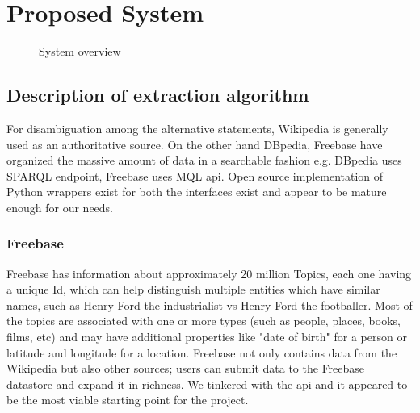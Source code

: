 \documentclass[11pt]{article}
\begin{document}
\section {Proposed System}


\begin{figure}
  \centering
  \caption{System overview}
  \label{fig:system}
\end{figure}


\subsection{Description of extraction algorithm}

For disambiguation among the alternative statements, Wikipedia is generally used
as an authoritative source. On the other hand DBpedia, Freebase have organized the
massive amount of data in a searchable fashion e.g. DBpedia uses SPARQL endpoint,
Freebase uses MQL api. Open source implementation of Python wrappers exist for
both the interfaces exist and appear to be mature enough for our needs.

\subsubsection{Freebase} 
Freebase has information about approximately 20 million Topics, each one having a
unique Id, which can help distinguish multiple entities which have similar names,
such as Henry Ford the industrialist vs Henry Ford the footballer. Most of the
topics are associated with one or more types\cite{freebasetype} (such as
people, places, books, films, etc) and may have additional properties like "date of birth" for a person
or latitude and longitude for a location. Freebase not only contains data from
the Wikipedia but also other sources; users can submit data to the Freebase
datastore and expand it in richness. We tinkered with the api\cite{freebaseapi}
and it appeared to be the most viable starting point for the project.
\end{document}
